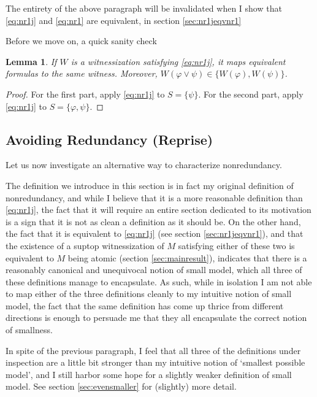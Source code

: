 \documentclass{article}
\newtheorem{lemma}[theorem]{Lemma}
\theoremstyle{nonumberplain}
\newtheorem{proof}{Proof}
\begin{document}
The entirety of the above paragraph will be invalidated when I show that \eqref{eq:nr1j} and \eqref{eq:nr1} are equivalent, in section \ref{sec:nr1jeqvnr1}

Before we move on, a quick sanity check

\begin{lemma}
If $W$ is a witnessization satisfying \eqref{eq:nr1j}, it maps equivalent formulas to the same witness. Moreover, $W(\varphi \lor \psi) \in \{W(\varphi), W(\psi)\}$.
\end{lemma}

\begin{proof}
For the first part, apply \eqref{eq:nr1j} to $S = \{\psi\}$. For the second part, apply \eqref{eq:nr1j} to $S = \{\varphi, \psi\}$.
\end{proof}

\subsection{Avoiding Redundancy (Reprise)}

Let us now investigate an alternative way to characterize nonredundancy.

The definition we introduce in this section is in fact my original definition of nonredundancy, and while I believe that it is a more reasonable definition than \eqref{eq:nr1j}, the fact that it will require an entire section dedicated to its motivation is a sign that it is not as clean a definition as it should be. On the other hand, the fact that it is equivalent to \eqref{eq:nr1j} (see section \ref{sec:nr1jeqvnr1}), and that the existence of a suptop witnessization of $M$ satisfying either of these two is equivalent to $M$ being atomic (section \ref{sec:mainresult}), indicates that there is a reasonably canonical and unequivocal notion of small model, which all three of these definitions manage to encapsulate. As such, while in isolation I am not able to map either of the three definitions cleanly to my intuitive notion of small model, the fact that the same definition has come up thrice from different directions is enough to persuade me that they all encapsulate the correct notion of smallness.

In spite of the previous paragraph, I feel that all three of the definitions under inspection are a little bit stronger than my intuitive notion of `smallest possible model', and I still harbor some hope for a slightly weaker definition of small model. See section \ref{sec:evensmaller} for (slightly) more detail.
\end{document}

